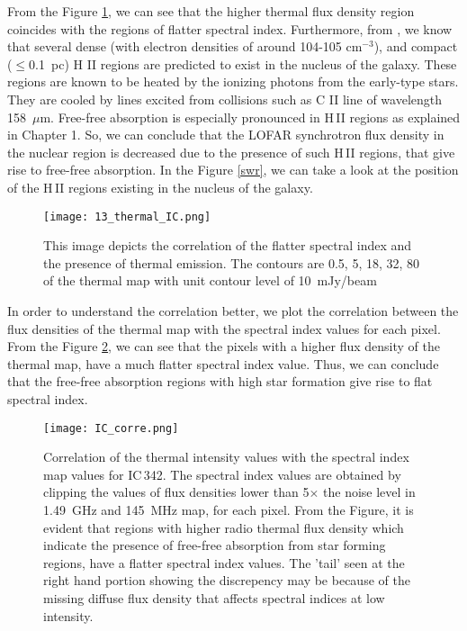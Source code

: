 \documentclass[../main/thesis_msc.tex]{subfiles}
\begin{document}
From the Figure \ref{hlaph_ic}, we can see that the higher thermal flux density region coincides with the regions of flatter spectral index. Furthermore, from \citet{ic342_3}, we know that several dense (with electron densities of around 104-105 cm$^{-3}$), and compact ($\leq$0.1~pc) H II regions are predicted to exist in the nucleus of the galaxy. These regions are known to be heated by the ionizing photons from the early-type stars. They are cooled by lines excited from collisions such as C II line of wavelength 158~$\mu$m. Free-free absorption is especially pronounced in H\,II regions as explained in Chapter 1. So, we can conclude that the LOFAR synchrotron flux density in the nuclear region is decreased due to the presence of such H\,II regions, that give rise to free-free absorption. In the Figure \ref{swr}, we can take a look at the position of the H\,II regions existing in the nucleus of the galaxy. \\
\begin{figure}
\centering
\texttt{[image: 13\_thermal\_IC.png]}
\caption{This image depicts the correlation of the flatter spectral index and the presence of thermal emission. The contours are 0.5, 5, 18, 32, 80 of the thermal map with unit contour level of 10~mJy/beam }
\label{hlaph_ic}
\end{figure}
In order to understand the correlation better, we plot the correlation between the flux densities of the thermal map with the spectral index values for each pixel. From the Figure \ref{corr_ic}, we can see that the pixels with a higher flux density of the thermal map, have a much flatter spectral index value. Thus, we can conclude that the free-free absorption regions with high star formation give rise to flat spectral index. \\
\begin{figure}
\centering
\texttt{[image: IC\_corre.png]}
\caption{Correlation of the thermal intensity values with the spectral index map values for IC\,342. The spectral index values are obtained by clipping the values of flux densities lower than 5$\times$ the noise level in 1.49~GHz and 145~MHz map, for each pixel. From the Figure, it is evident that regions with higher radio thermal flux density which indicate the presence of free-free absorption from star forming regions, have a flatter spectral index values. The 'tail' seen at the right hand portion showing the discrepency may be because of the missing diffuse flux density that affects spectral indices at low intensity.}
\label{corr_ic}
\end{figure}
\end{document}
